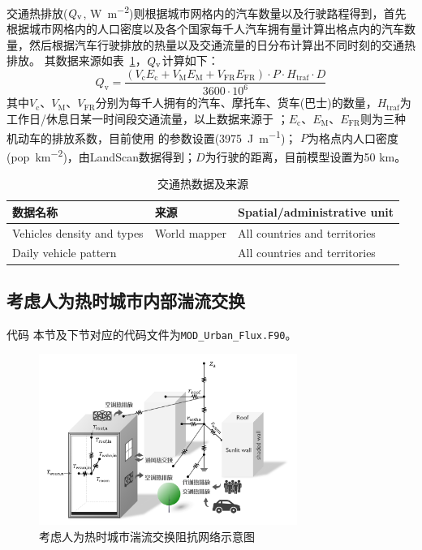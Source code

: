 交通热排放($Q_{\rm v}$, \unit{W.m^{-2}})则根据城市网格内的汽车数量以及行驶路程得到，首先根据城市网格内的人口密度以及各个国家每千人汽车拥有量计算出格点内的汽车数量，然后根据汽车行驶排放的热量以及交通流量的日分布计算出不同时刻的交通热排放。
其数据来源如表~\ref{tab:交通热数据及来源}，$Q_{\rm v}$计算如下：
\begin{equation}
  Q_{\mathrm{v}}=\frac{\left(V_{\mathrm{c}} E_{\mathrm{c}}+V_{\mathrm{M}} E_{\mathrm{M}}+V_{\mathrm{F R}} E_{\mathrm{FR}}\right)  \cdot P \cdot H_{\mathrm{traf}} \cdot D}{3600 \cdot 10^{6}}
\end{equation}
其中$V_{\mathrm {c}}$、$V_{\mathrm {M}}$、$V_{\mathrm{FR}}$分别为每千人拥有的汽车、摩托车、货车(巴士)的数量，$H_{\mathrm{traf}}$为工作日/休息日某一时间段交通流量，以上数据来源于 \citet{allen2011}；$E_{\mathrm {c}}$、$E_{\mathrm {M}}$、$E_{\mathrm{FR}}$则为三种机动车的排放系数，目前使用 \citet{sailor2004top} 的参数设置(\qty{3975}{J.m^{-1}})；
$P$为格点内人口密度 (\unit{pop.km^{-2}})，由LandScan数据得到；$D$为行驶的距离，目前模型设置为50 km。

\begin{table}[htbp]
  \centering
  \caption{交通热数据及来源}\label{tab:交通热数据及来源}
  \begin{tabular}{@{}lll@{}}
    \toprule
    数据名称                   & 来源                   & Spatial/administrative unit   \\ \midrule
    Vehicles density and types & World mapper           & All countries and territories \\
    Daily vehicle pattern      & \citet{Hallenbeck1997} & All countries and territories \\ \bottomrule
  \end{tabular}
\end{table}

\subsection{考虑人为热时城市内部湍流交换}

\begin{mymdframed}{代码}
  本节及下节对应的代码文件为\texttt{MOD\_Urban\_Flux.F90}。
\end{mymdframed}
{
  \begin{figure}[h!]
    \centering
    \includegraphics[width=0.75\textwidth]{Figures/城市模式/CoLM城市模式人为热阻抗交换网络_v2.png}
    \caption{考虑人为热时城市湍流交换阻抗网络示意图}
    \label{fig:考虑人为热时城市内部湍流交换过程}
  \end{figure}
}
